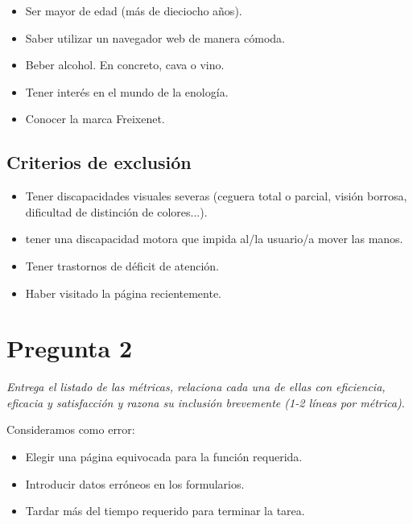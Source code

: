 \documentclass[spanish]{article}
\begin{document}
\begin{itemize}

\item Ser mayor de edad (más de dieciocho años).

\item Saber utilizar un navegador web de manera cómoda.

\item Beber alcohol. En concreto, cava o vino.

\item Tener interés en el mundo de la enología.

\item Conocer la marca Freixenet.

\end{itemize}

\subsection{Criterios de exclusión}

\begin{itemize}

\item Tener discapacidades visuales severas (ceguera total o
parcial, visión borrosa, dificultad de distinción de
colores...).

\item tener una discapacidad motora que impida al/la
usuario/a mover las manos.

\item Tener trastornos de déficit de atención.

\item Haber visitado la página recientemente.

\end{itemize}

\section{Pregunta 2}

\textit{Entrega el listado de las métricas, relaciona cada
una de ellas con eficiencia, eficacia y satisfacción y
razona su inclusión brevemente (1-2 líneas por
métrica).}\newline

Consideramos como error:

\begin{itemize}

\item Elegir una página equivocada para la función
requerida.

\item Introducir datos erróneos en los formularios.

\item Tardar más del tiempo requerido para terminar la
tarea.

\end{itemize}
\end{document}
